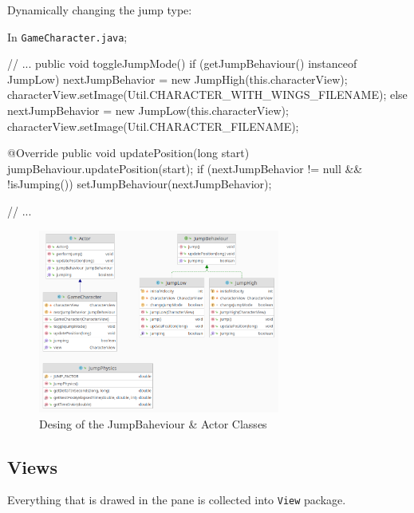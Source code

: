 \documentclass[a4paper]{article}
\begin{document}
Dynamically changing the jump type:

In \texttt{GameCharacter.java};

\begin{javacode}
// ...
public void toggleJumpMode() {
  if (getJumpBehaviour() instanceof JumpLow) {
    nextJumpBehavior = new JumpHigh(this.characterView);
    characterView.setImage(Util.CHARACTER_WITH_WINGS_FILENAME);
  } else {
    nextJumpBehavior = new JumpLow(this.characterView);
    characterView.setImage(Util.CHARACTER_FILENAME);
  }
}

@Override
public void updatePosition(long start) {
  jumpBehaviour.updatePosition(start);
  if (nextJumpBehavior != null && !isJumping()) {
    setJumpBehaviour(nextJumpBehavior);
  }
}

// ...
\end{javacode}

\begin{figure}[htbp]
\centering
\includegraphics[width=300px]{org-img/Design_Explanation/2021-10-28_02-05-29_screenshot.png}
\caption{Desing of the JumpBaheviour \& Actor Classes}
\end{figure}




\newpage
\subsection*{Views}
\label{sec:org3785fd3}

Everything that is drawed in the pane is collected into \texttt{View} package.
\end{document}
